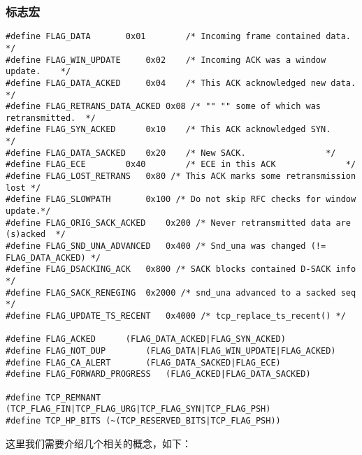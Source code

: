         \subsubsection{标志宏}
\begin{verbatim}
#define FLAG_DATA       0x01        /* Incoming frame contained data.       */
#define FLAG_WIN_UPDATE     0x02    /* Incoming ACK was a window update.    */
#define FLAG_DATA_ACKED     0x04    /* This ACK acknowledged new data.      */
#define FLAG_RETRANS_DATA_ACKED 0x08 /* "" "" some of which was retransmitted.  */
#define FLAG_SYN_ACKED      0x10    /* This ACK acknowledged SYN.       */
#define FLAG_DATA_SACKED    0x20    /* New SACK.                */
#define FLAG_ECE        0x40        /* ECE in this ACK              */
#define FLAG_LOST_RETRANS   0x80 /* This ACK marks some retransmission lost */
#define FLAG_SLOWPATH       0x100 /* Do not skip RFC checks for window update.*/
#define FLAG_ORIG_SACK_ACKED    0x200 /* Never retransmitted data are (s)acked  */
#define FLAG_SND_UNA_ADVANCED   0x400 /* Snd_una was changed (!= FLAG_DATA_ACKED) */
#define FLAG_DSACKING_ACK   0x800 /* SACK blocks contained D-SACK info */
#define FLAG_SACK_RENEGING  0x2000 /* snd_una advanced to a sacked seq */
#define FLAG_UPDATE_TS_RECENT   0x4000 /* tcp_replace_ts_recent() */

#define FLAG_ACKED      (FLAG_DATA_ACKED|FLAG_SYN_ACKED)
#define FLAG_NOT_DUP        (FLAG_DATA|FLAG_WIN_UPDATE|FLAG_ACKED)
#define FLAG_CA_ALERT       (FLAG_DATA_SACKED|FLAG_ECE)
#define FLAG_FORWARD_PROGRESS   (FLAG_ACKED|FLAG_DATA_SACKED)

#define TCP_REMNANT (TCP_FLAG_FIN|TCP_FLAG_URG|TCP_FLAG_SYN|TCP_FLAG_PSH)
#define TCP_HP_BITS (~(TCP_RESERVED_BITS|TCP_FLAG_PSH))
\end{verbatim}

            这里我们需要介绍几个相关的概念，如下：

